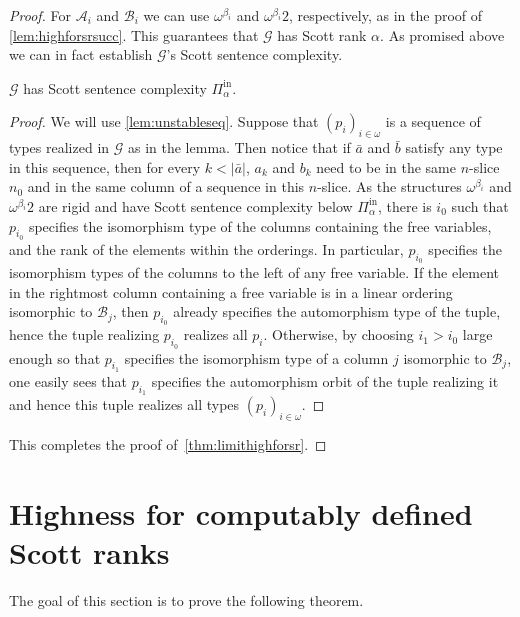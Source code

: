 \documentclass{amsart}
\newcommand\+[1]{\mathcal{#1}}
\renewcommand\*[1]{\mathbf{#1}}
\renewcommand\=[1]{\text{#1}}
\renewcommand\*[1]{\mathbf{#1}}
\newcommand{\Pinf}[1]{\Pi^{\mathrm{in}}_{#1}}
\newcommand{\nat}{\omega}
\begin{document}
\begin{proof}
   For $\+A_i$ and $\+B_i$ we can use $\omega^{\beta_i}$ and $\omega^{\beta_i}2$, respectively, as in the proof of \cref{lem:highforsrsucc}.
   This guarantees that $\+G$ has Scott rank $\alpha$. As promised above we can in fact establish $\+G$'s Scott sentence complexity.
     \begin{claim} $\+G$ has Scott sentence complexity $\Pinf{\alpha}$.\end{claim}
     \begin{proof}
       We will use \cref{lem:unstableseq}. Suppose that $(p_i)_{i\in\nat}$ is a sequence of types realized in $\+G$ as in the lemma. Then notice that if $\bar a$ and $\bar b$ satisfy any type in this sequence, then for every $k<|\bar a|$, $a_k$ and $b_k$ need to be in the same $n$-slice $n_0$ and in the same column of a sequence in this $n$-slice. As the structures $\omega^{\beta_i}$ and $\omega^{\beta_i}2$ are rigid and have Scott sentence complexity below $\Pinf{\alpha}$, there is $i_0$ such that $p_{i_0}$ specifies the isomorphism type of the columns containing the free variables, and the rank of the elements within the orderings. In particular, $p_{i_0}$ specifies the isomorphism types of the columns to the left of any free variable. If the element in the rightmost column containing a free variable is in a linear ordering isomorphic to $\+B_j$, then $p_{i_0}$ already specifies the automorphism type of the tuple, hence the tuple realizing $p_{i_0}$ realizes all $p_i$. Otherwise, by choosing $i_1>i_0$ large enough so that $p_{i_1}$ specifies the isomorphism type of a column $j$ isomorphic to $\+B_j$, one easily sees that $p_{i_1}$ specifies the automorphism orbit of the tuple realizing it and hence this tuple realizes all types $(p_i)_{i\in\nat}$.
     \end{proof}
     This completes the proof of~\cref{thm:limithighforsr}.
 \end{proof}
 
 \section{Highness for computably defined Scott ranks}\label{sec:cdSr}
 The goal of this section is to prove the following theorem.
 
\end{document}
